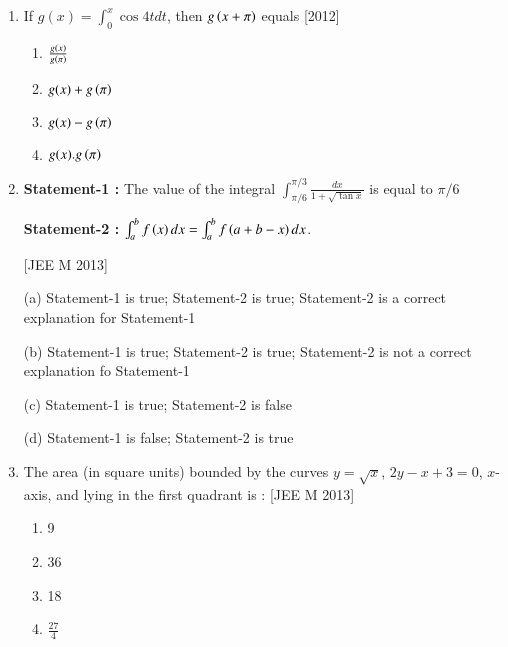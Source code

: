 \documentclass[journal,12pt,twocolumn]{IEEEtran}
\theoremstyle{remark}
\begin{document}
\begin{enumerate}[label=\textcolor{black}{\arabic*.}]
		\begin{multicols}{4}
			\begin{enumerate}[label=(\alph*)]
				\item $20\sqrt{2}$
				\item $\frac{10\sqrt{2}}{3}$
				\item $\frac{20\sqrt{2}}{3}$
				\item $10\sqrt{2}$
			\end{enumerate}
		\end{multicols}


	\item If $g(x)=\int_0^x\cos 4t dt$, then $g\left(x+\pi\right)$ equals
		\hfill{[2012]}

		\begin{multicols}{2}
			\begin{enumerate}[label=(\alph*)]
				\item $\frac{g(x)}{g\left(\pi\right)}$
				\item $g(x)+g\left(\pi\right)$
				\item $g(x)-g\left(\pi\right)$
				\item $g(x).g\left(\pi\right)$
			\end{enumerate}
		\end{multicols}


	\item \textbf{Statement-1 :} The value of the integral $\int_{\pi/6}^{\pi/3}\frac{dx}{1+\sqrt{\tan x}}$ is equal to $\pi/6$

		\textbf{Statement-2 :} $\int_a^bf\left(x\right)dx=\int_a^bf\left(a+b-x\right)dx$.

		\hfill{[JEE M 2013]}
		
		(a) Statement-1 is true; Statement-2 is true; Statement-2 is a correct explanation for Statement-1

		(b) Statement-1 is true; Statement-2 is true; Statement-2 is not a correct explanation fo Statement-1

		(c) Statement-1 is true; Statement-2 is false

		(d) Statement-1 is false; Statement-2 is true


	\item The area (in square units) bounded by the curves $y=\sqrt{x}$, $2y-x+3=0$, $x$-axis, and lying in the first quadrant is :
		\hfill{[JEE M 2013]}

		\begin{multicols}{4}
			\begin{enumerate}[label=(\alph*)]
				\item 9
				\item 36
				\item 18
				\item $\frac{27}{4}$
			\end{enumerate}
		\end{multicols}



\end{enumerate}
\end{document}

